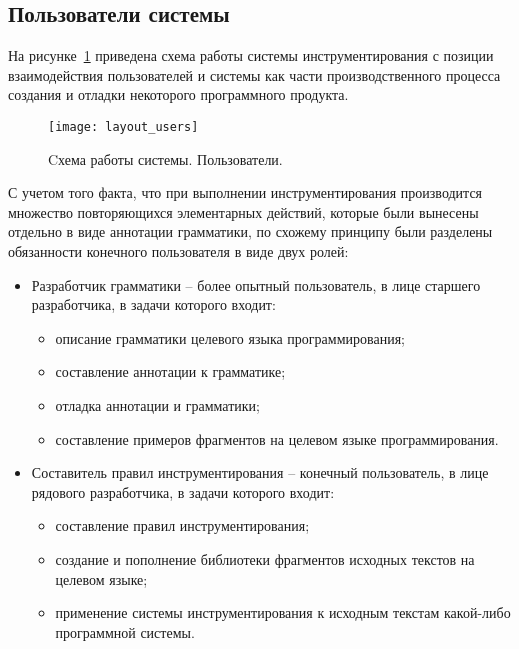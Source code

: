 \subsection{Пользователи системы}

На рисунке~\ref{fig:layout_users} приведена схема работы системы инструментирования с позиции взаимодействия пользователей и системы как части производственного процесса создания и отладки некоторого программного продукта.

\begin{figure}[!h]
	\centering
	\texttt{[image: layout\_users]}
	\caption{Cхема работы системы. Пользователи.}
	\label{fig:layout_users}
\end{figure}

С учетом того факта, что при выполнении инструментирования производится множество повторяющихся элементарных действий, которые были вынесены отдельно в виде аннотации грамматики, по схожему принципу были разделены обязанности конечного пользователя в виде двух ролей:
\begin{itemize}[noitemsep]
  \item Разработчик грамматики -- более опытный пользователь, в лице старшего разработчика, в задачи которого входит:
    \begin{itemize}[noitemsep]
      \item описание грамматики целевого языка программирования;
      \item составление аннотации к грамматике;
      \item отладка аннотации и грамматики;
      \item составление примеров фрагментов на целевом языке программирования.
    \end{itemize}

  \item Составитель правил инструментирования -- конечный пользователь, в лице рядового разработчика, в задачи которого входит:
    \begin{itemize}[noitemsep]
      \item составление правил инструментирования;
      \item создание и пополнение библиотеки фрагментов исходных текстов на целевом языке;
      \item применение системы инструментирования к исходным текстам какой-либо программной системы.
    \end{itemize}
\end{itemize}

